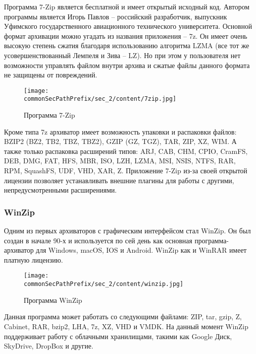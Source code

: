 Программа 7-Zip является бесплатной и имеет открытый исходный код. 
Автором программы является Игорь Павлов -- российский разработчик, выпускник Уфимского государственного авиационного технического университета.
Основной формат архивации можно угадать из названия приложения -- 7z. 
Он имеет очень высокую степень сжатия благодаря использованию алгоритма LZMA (все тот же усовершенствованный Лемпеля и Зива -- LZ). 
Но при этом у пользователя нет возможности управлять файлом внутри архива и сжатые файлы данного формата не защищены от повреждений.

\begin{figure}[h]
    \centering
    \texttt{[image: \\commonSecPathPrefix/sec\_2/content/7zip.jpg]}
    \caption{Программа 7-Zip}
    \label{fig:7zip}
\end{figure}



Кроме типа 7z архиватор имеет возможность упаковки и распаковки файлов: BZIP2 (BZ2, TB2, TBZ, TBZ2), GZIP (GZ, TGZ), TAR, ZIP, XZ, WIM.
А также только распаковка расширений типов:  ARJ, CAB, CHM, CPIO, CramFS, DEB, DMG, FAT, HFS, MBR, ISO, LZH, LZMA, MSI, NSIS, NTFS, RAR, RPM, SquashFS, UDF, VHD, XAR, Z.
Приложение 7-Zip из-за своей открытой лицензии позволяет устанавливать внешние плагины для работы с другими, непредусмотренными расширениями.



\subsubsection{WinZip}

Одним из первых архиваторов с графическим интерфейсом стал WinZip. 
Он был создан в начале 90-х и используется по сей день как основная программа-архиватор для Windows, macOS, IOS и Android.
WinZip как и WinRAR имеет платную лицензию.

\begin{figure}[h]
    \centering
    \texttt{[image: \\commonSecPathPrefix/sec\_2/content/winzip.jpg]}
    \caption{Программа WinZip}
    \label{fig:winzip}
\end{figure}



Данная программа может работать со следующими файлами: ZIP, tar, gzip, Z, Cabinet, RAR, bzip2, LHA, 7z, XZ, VHD и VMDK.
На данный момент WinZip поддерживает работу с облачными хранилищами, такими как Google Диск, SkyDrive, DropBox и другие.




